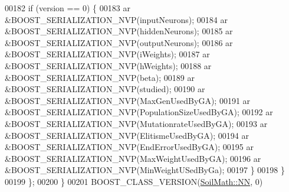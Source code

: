 \begin{DoxyCode}
00182     \textcolor{keywordflow}{if} (version == 0) \{
00183       ar &BOOST\_SERIALIZATION\_NVP(inputNeurons);
00184       ar &BOOST\_SERIALIZATION\_NVP(hiddenNeurons);
00185       ar &BOOST\_SERIALIZATION\_NVP(outputNeurons);
00186       ar &BOOST\_SERIALIZATION\_NVP(iWeights);
00187       ar &BOOST\_SERIALIZATION\_NVP(hWeights);
00188       ar &BOOST\_SERIALIZATION\_NVP(beta);
00189       ar &BOOST\_SERIALIZATION\_NVP(studied);
00190       ar &BOOST\_SERIALIZATION\_NVP(MaxGenUsedByGA);
00191       ar &BOOST\_SERIALIZATION\_NVP(PopulationSizeUsedByGA);
00192       ar &BOOST\_SERIALIZATION\_NVP(MutationrateUsedByGA);
00193       ar &BOOST\_SERIALIZATION\_NVP(ElitismeUsedByGA);
00194       ar &BOOST\_SERIALIZATION\_NVP(EndErrorUsedByGA);
00195       ar &BOOST\_SERIALIZATION\_NVP(MaxWeightUsedByGA);
00196       ar &BOOST\_SERIALIZATION\_NVP(MinWeightUSedByGa);
00197     \}
00198   \}
00199 \};
00200 \}
00201 BOOST\_CLASS\_VERSION(\hyperlink{class_soil_math_1_1_n_n}{SoilMath::NN}, 0)
\end{DoxyCode}
